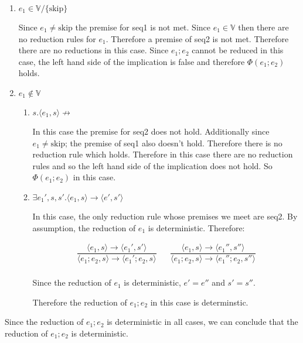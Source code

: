 \documentclass[10pt,\jkfside,a4paper]{article}
\begin{document}
\begin{enumerate}
\begin{enumerate}[label=\textbf{Case}]
\begin{enumerate}[label=\textbf{Case}]
\item $e_1 \in \mathbb{V}/\{\text{skip}\}$

Since $e_1 \neq \text{skip}$ the premise for seq1 is not met. Since $e_1
\in \mathbb{V}$ then there are no reduction rules for $e_1$.
Therefore a premise of seq2 is not met. Therefore there are no
reductions in this case. Since $e_1; e_2$ cannot be reduced in this case,
the left hand side of the implication is false and therefore $\Phi(e_1; e_2)$
holds.

\item $e_1 \notin \mathbb{V}$

\begin{enumerate}[label=\textbf{Case}]

\item $s. \langle e_1, s \rangle \not\to $

In this case the premise for seq2 does not hold. Additionally since
$e_1 \neq \text{skip}$; the premise of seq1 also doesn't hold.
Therefore there is no reduction rule which holds. Therefore in this case
there are no reduction rules and so the left hand side of the implication
does not hold. So $\Phi(e_1; e_2)$ in this case.

\item $\exists e_1', s, s'. \langle e_1, s \rangle \to \langle
e', s' \rangle $

In this case, the only reduction rule whose premises we meet are seq2.
By assumption, the reduction of $e_1$ is deterministic. Therefore:

\begin{align}
\dfrac{\langle e_1, s \rangle \to \langle e_1', s' \rangle}
{ \langle e_1; e_2, s \rangle \to \langle e_1'; e_2, s \rangle}
& &
\dfrac{\langle e_1, s \rangle \to \langle e_1'', s'' \rangle}
{ \langle e_1; e_2, s \rangle \to \langle e_1''; e_2, s''
\rangle} \\
\end{align}

Since the reduction of $e_1$ is deterministic, $e' = e''$ and $s' = s''$.

Therefore the reduction of $e_1; e_2$ in this case is determinstic.

\end{enumerate}

\end{enumerate}

Since the reduction of $e_1; e_2$ is deterministic in all cases, we can
conclude that the reduction of $e_1; e_2$ is deterministic.


\end{enumerate}
\end{enumerate}
\end{document}
